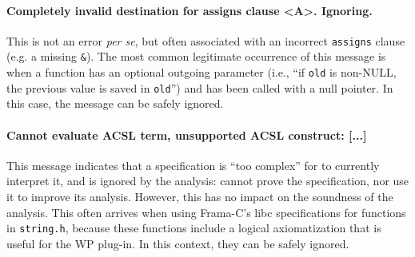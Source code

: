 \documentclass{frama-c-book}
\begin{document}
\paragraph{Completely invalid destination for assigns clause <A>. Ignoring.}
This is not an error {\em per se}, but often associated with an incorrect
\texttt{assigns} clause (e.g. a missing \texttt{\&}). The most common
legitimate occurrence of this message is when a function has an
optional outgoing parameter (i.e., ``if \texttt{old} is non-NULL, the previous
value is saved in \texttt{old}'') and has been called with a null pointer.
In this case, the message can be safely ignored.

\paragraph{Cannot evaluate ACSL term, unsupported ACSL construct: [...]}
This message indicates that a specification is ``too complex'' for \Eva{} to
currently interpret it, and is ignored by the analysis:
\Eva{} cannot prove the specification, nor use it to improve its analysis.
However, this has no impact on the soundness of the analysis.
This often arrives when using Frama-C's libc specifications for functions in
\texttt{string.h}, because these functions include a logical axiomatization
that is useful for the \textsf{WP} plug-in.
In this context, they can be safely ignored.
\end{document}
